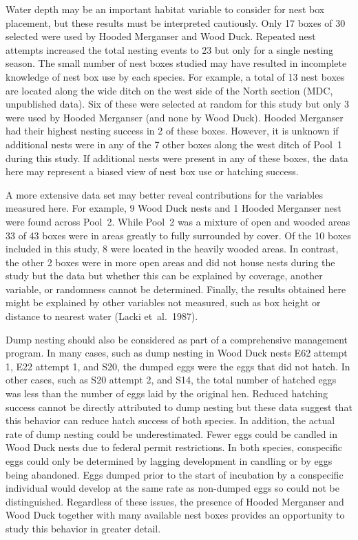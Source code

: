 Water depth may be an important habitat variable to consider for nest box placement, but these results must be interpreted cautiously. Only 17 boxes of 30 selected were used by Hooded Merganser and Wood Duck. Repeated nest attempts increased the total nesting events to 23 but only for a single nesting season. The small number of nest boxes studied may have resulted in incomplete knowledge of nest box use by each species. For example, a total of 13 nest boxes are located along the wide ditch on the west side of the North section (MDC, unpublished data). Six of these were selected at random for this study but only 3 were used by Hooded Merganser (and none by Wood Duck). Hooded Merganser had their highest nesting success in 2 of these boxes. However, it is unknown if additional nests were in any of the 7 other boxes along the west ditch of Pool~1 during this study. If additional nests were present in any of these boxes, the data here may represent a biased view of nest box use or hatching success. 

A more extensive data set may better reveal contributions for the variables measured here. For example, 9 Wood Duck nests and 1 Hooded Merganser nest were found across Pool~2. While Pool~2 was a mixture of open and wooded areas 33 of 43 boxes were in areas greatly to fully surrounded by cover. Of the 10 boxes included in this study, 8 were located in the heavily wooded areas. In contrast, the other 2 boxes were in more open areas and did not house nests during the study but the data but whether this can be explained by coverage, another variable, or randomness cannot be determined. Finally, the results obtained here might be explained by other variables not measured, such as box height or distance to nearest water (Lacki et~al.~1987). 

Dump nesting should also be considered as part of a comprehensive management program. In many cases, such as dump nesting in Wood Duck nests E62 attempt 1, E22 attempt 1, and S20, the dumped eggs were the eggs that did not hatch. In other cases, such as S20 attempt 2, and S14, the total number of hatched eggs was less than the number of eggs laid by the original hen. Reduced hatching success cannot be directly attributed to dump nesting but these data suggest that this behavior can reduce hatch success of both species. In addition, the actual rate of dump nesting could be underestimated. Fewer eggs could be candled in Wood Duck nests due to federal permit restrictions. In both species, conspecific eggs could only be determined by lagging development in candling or by eggs being abandoned. Eggs dumped prior to the start of incubation by a conspecific individual would develop at the same rate as non-dumped eggs so could not be distinguished. Regardless of these issues, the presence of Hooded Merganser and Wood Duck together with many available nest boxes provides an opportunity to study this behavior in greater detail.  

